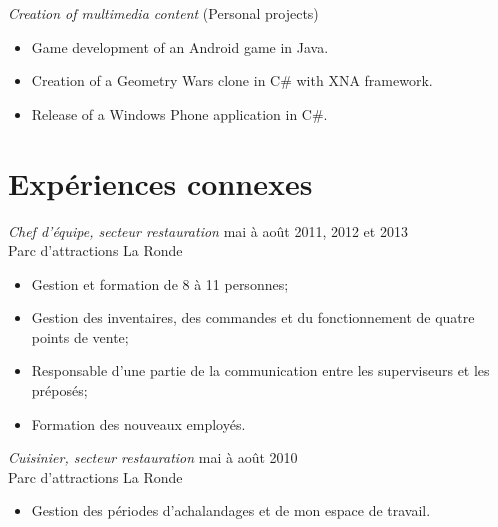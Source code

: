 \documentclass{res}
\newcommand{\inFrench}[1]{#1}
\newcommand{\inEnglish}[1]{}
\begin{document}
\begin{resume}
{	{\sl Creation of multimedia content} \hfill (Personal projects)
	\vspace{0.05in}
	\begin{itemize} \itemsep -2pt
		\item Game development of an Android game in Java.
		\item Creation of a Geometry Wars clone in C\# with XNA framework.
		\item Release of a Windows Phone application in C\#.
	\end{itemize}
}


\inFrench{
	\section{Expériences connexes}
}
\inEnglish{
	\section{Other experiences}
}
\vspace{6pt}

\inFrench{
	{\sl Chef d'équipe, secteur restauration}
		\hfill mai à août 2011, 2012 et 2013 \\
	Parc d'attractions La Ronde

	\vspace{0.05in}
	\begin{itemize} \itemsep -2pt
		\item Gestion et formation de 8 à 11 personnes;
		\item Gestion des inventaires, des commandes et du fonctionnement de quatre points de vente;
		\item Responsable d’une partie de la communication entre les superviseurs et les préposés;
		\item Formation des nouveaux employés.
	\end{itemize}


	{\sl Cuisinier, secteur restauration}
		\hfill mai à août 2010 \\
	Parc d'attractions La Ronde

	\vspace{0.05in}
	\begin{itemize} \itemsep -2pt
		\item Gestion des périodes d’achalandages et de mon espace de travail.
	\end{itemize}
}

\inEnglish{
	{\sl Team leader, restauration sector}
		\hfill May to August 2011, 2012 and 2013 \\
	Amusement park, La Ronde

}
\end{resume}
\end{document}
